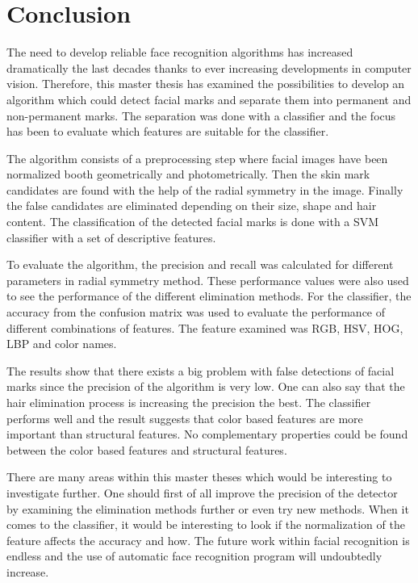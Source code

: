 \chapter{Conclusion}\label{cha:conclusion}

The need to develop reliable face recognition algorithms has increased dramatically the last decades thanks to ever increasing developments in computer vision. Therefore, this master thesis has examined the possibilities to develop an algorithm which could detect facial marks and separate them into permanent and non-permanent marks. The separation was done with a classifier and the focus has been to evaluate which features are suitable for the classifier.  

The algorithm consists of a preprocessing step where facial images have been normalized booth geometrically and photometrically. Then the skin mark candidates are found with the help of the radial symmetry in the image. Finally the false candidates are eliminated depending on their size, shape and hair content. The classification of the detected facial marks is done with a SVM classifier with a set of descriptive features. 

To evaluate the algorithm, the precision and recall was calculated for different parameters in radial symmetry method. These performance values were also used to see the performance of the different elimination methods. For the classifier, the accuracy from the confusion matrix was used to evaluate the performance of different combinations of features. The feature examined was RGB, HSV, HOG, LBP and color names. 

The results show that there exists a big problem with false detections of facial marks since the precision of the algorithm is very low. One can also say that the hair elimination process is increasing the precision the best. The classifier performs well and the result suggests that color based features are more important than structural features. No complementary properties could be found between the color based features and structural features.

There are many areas within this master theses which would be interesting to investigate further. One should first of all improve the precision of the detector by examining the elimination methods further or even try new methods. When it comes to the classifier, it would be interesting to look if the normalization of the feature affects the accuracy and how. The future work within facial recognition is endless and the use of automatic face recognition program will undoubtedly increase. 

